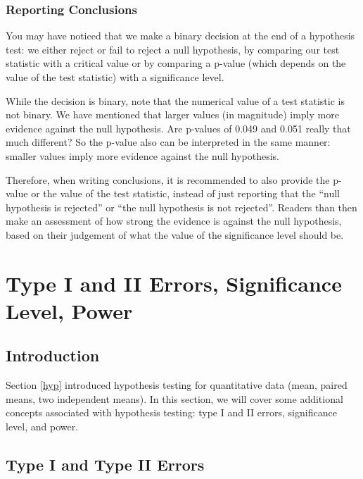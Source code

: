\documentclass[
]{book}
\theoremstyle{definition}
\theoremstyle{definition}
\theoremstyle{definition}
\theoremstyle{definition}
\theoremstyle{remark}
\begin{document}
\hypertarget{reporting-conclusions}{%
\subsection{Reporting Conclusions}\label{reporting-conclusions}}

You may have noticed that we make a binary decision at the end of a hypothesis test: we either reject or fail to reject a null hypothesis, by comparing our test statistic with a critical value or by comparing a p-value (which depends on the value of the test statistic) with a significance level.

While the decision is binary, note that the numerical value of a test statistic is not binary. We have mentioned that larger values (in magnitude) imply more evidence against the null hypothesis. Are p-values of 0.049 and 0.051 really that much different? So the p-value also can be interpreted in the same manner: smaller values imply more evidence against the null hypothesis.

Therefore, when writing conclusions, it is recommended to also provide the p-value or the value of the test statistic, instead of just reporting that the ``null hypothesis is rejected'' or ``the null hypothesis is not rejected''. Readers than then make an assessment of how strong the evidence is against the null hypothesis, based on their judgement of what the value of the significance level should be.

\hypertarget{prac}{%
\chapter{Type I and II Errors, Significance Level, Power}\label{prac}}

\hypertarget{introduction-5}{%
\section{Introduction}\label{introduction-5}}

Section \ref{hyp} introduced hypothesis testing for quantitative data (mean, paired means, two independent means). In this section, we will cover some additional concepts associated with hypothesis testing: type I and II errors, significance level, and power.

\hypertarget{type-i-and-type-ii-errors}{%
\section{Type I and Type II Errors}\label{type-i-and-type-ii-errors}}
\end{document}
